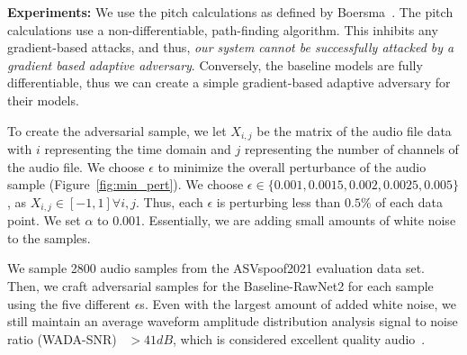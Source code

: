 \documentclass[10pt, journal, anonymous=true]{IEEEtran}
\begin{document}
\noindent\textbf{Experiments:} We use the pitch calculations as defined by Boersma~\cite{boersma1993accurate}.
The pitch calculations  use a non-differentiable, path-finding algorithm.
This inhibits any gradient-based attacks, and thus, \emph{our system cannot be successfully attacked by a gradient based adaptive adversary}.
Conversely, the baseline models are fully differentiable, thus we can create a simple gradient-based adaptive adversary for their models.

To create the adversarial sample, we let $X_{i,j}$ be the matrix of the audio file data with $i$ representing the time domain and $j$ representing the number of channels of the audio file. We choose $\epsilon$ to minimize the overall perturbance of the audio sample (Figure~\ref{fig:min_pert}).
We choose
$\epsilon \in \{ 0.001, 0.0015,0.002, 0.0025, 0.005 \}$, as 
$X_{i,j} \in [-1,1] \forall i,j$. Thus, each 
$\epsilon$ is perturbing less than $0.5\%$ of each data point. We set $\alpha$ to 0.001. 
Essentially, we are adding small amounts of white noise to the
samples. 

We sample 2800 audio samples from the ASVspoof2021 evaluation data set. Then, we
craft adversarial samples for the Baseline-RawNet2 for each sample using the five different $\epsilon$s. 
Even with the largest amount of added white noise, we still maintain an average waveform amplitude distribution analysis signal to noise ratio (WADA-SNR)~\cite{Kim2008RobustSR} $>41dB$,
which is considered excellent quality audio~\cite{snr_quality}.
\end{document}
